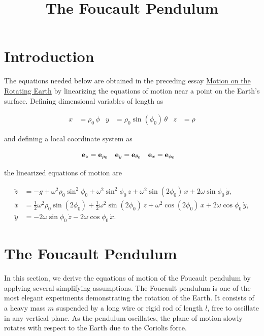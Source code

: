 \documentclass[12pt]{article}
\title{The Foucault Pendulum}
\author{}
\date{}
\begin{document}
\maketitle

\section{Introduction}

The equations needed below are obtained in the preceding essay \href{/physics/classical-mechanics/rigid-body-motion/motion-on-the-rotating-earth}{Motion on the Rotating Earth} by linearizing
the equations of motion near a point on the Earth's surface. Defining dimensional
variables of length as  

\begin{align}
  x &= \rho_0\,\phi & y &= \rho_0\sin(\phi_0)\,\theta & z &= \rho
\end{align}

and defining a local coordinate system as

\begin{align}
  \vb{e}_z &= \vb{e}_{\rho_0} &
  \vb{e}_y &= \vb{e}_{\theta_0} &
  \vb{e}_x &= \vb{e}_{\phi_0}
\end{align}

the linearized equations of motion are

\begin{equation}
  \begin{aligned}
    \ddot{z}
    &=
    -g
    +\omega^2\rho_0\sin^2\phi_0
    +\omega^2\sin^2\phi_0\,z
    +\omega^2\sin(2\phi_0)\,x
    +2\omega\sin\phi_0\,\dot{y},
    \\
    \ddot{x}
    &=
    \frac{1}{2}\omega^2\rho_0\sin(2\phi_0)
    +\frac{1}{2}\omega^2\sin(2\phi_0)\,z
    +\omega^2\cos(2\phi_0)\,x
    +2\omega\cos\phi_0\,\dot{y},
    \\
    \ddot{y}
    &=
    -2\omega\sin\phi_0\,\dot{z}
    -2\omega\cos\phi_0\,\dot{x}.
  \end{aligned}
  \label{earth:local-cartesian-equations}
\end{equation}

\section{The Foucault Pendulum}

In this section, we derive the equations of motion of the Foucault pendulum by
applying several simplifying assumptions. The Foucault pendulum is one of the
most elegant experiments demonstrating the rotation of the Earth. It consists of
a heavy mass $m$ suspended by a long wire or rigid rod of length $l$, free to
oscillate in any vertical plane. As the pendulum oscillates, the plane of motion
slowly rotates with respect to the Earth due to the Coriolis force. \par
\end{document}
